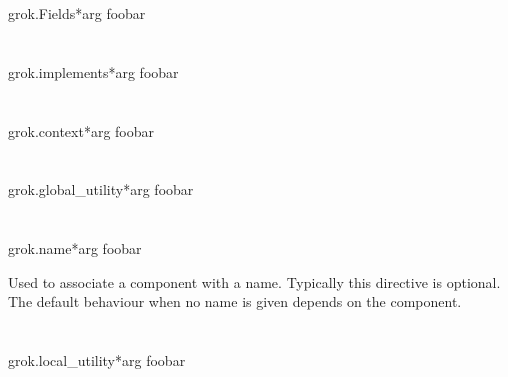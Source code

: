        \begin{funcdesc}{grok.Fields}{*arg}
        foobar
        \end{funcdesc}

    \section{}

        \begin{funcdesc}{grok.implements}{*arg}
        foobar
        \end{funcdesc}

    \section{}

        \begin{funcdesc}{grok.context}{*arg}
        foobar
        \end{funcdesc}

    \section{}

        \begin{funcdesc}{grok.global_utility}{*arg}
        foobar
        \end{funcdesc}

    \section{}

        \begin{funcdesc}{grok.name}{*arg}
        foobar
        \end{funcdesc}

        Used to associate a component with a name. Typically this directive is
        optional. The default behaviour when no name is given depends on the
        component.

    \section{}

        \begin{funcdesc}{grok.local_utility}{*arg}
        foobar
        \end{funcdesc}

